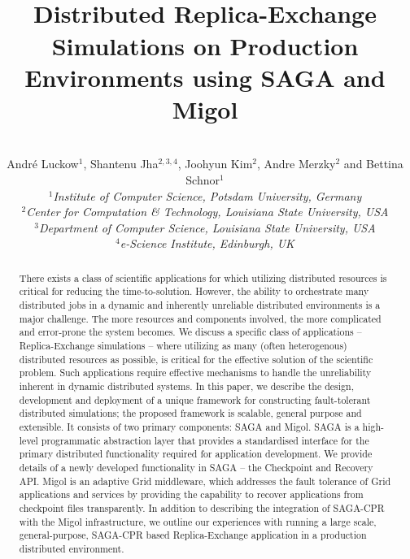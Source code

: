 \documentclass[conference,final]{IEEEtran}
\title{
  ~\\[-3em]
  Distributed Replica-Exchange Simulations on Production Environments
  using SAGA and Migol}
\author{
  ~\\[-2em]
  Andr\'e Luckow$^{1}$, Shantenu Jha$^{2,3,4}$, Joohyun Kim$^{2}$, Andre Merzky$^{2}$ and Bettina Schnor$^{1}$\\
  \small{\emph{$^{1}$Institute of Computer Science, Potsdam University, Germany}}\\
  \small{\emph{$^{2}$Center for Computation \& Technology, Louisiana State University, USA}}\\
  \small{\emph{$^{3}$Department of Computer Science, Louisiana State
      University, USA}}\\
  \small{\emph{$^{4}$e-Science Institute, Edinburgh, UK}}\\
}
\newcommand{\up}{\vspace*{-1em}}
\begin{document}
 


\maketitle    

\up\up\up\up
\begin{abstract}
  There exists a class of scientific applications for which utilizing
  distributed resources is critical for reducing the
  time-to-solution. However, the ability to orchestrate many
  distributed jobs in a dynamic and inherently unreliable distributed
  environments is a major challenge. The more resources and components
  involved, %
  the more complicated and error-prone the system becomes. We discuss
  a specific class of applications -- Replica-Exchange simulations
  -- where utilizing as many (often heterogenous) distributed
  resources as possible, is critical for the effective solution of the
  scientific problem. Such applications require effective mechanisms
  to handle the unreliability inherent in dynamic distributed systems.
  In this paper, we describe the design, development and deployment of
  a unique framework for constructing fault-tolerant distributed
  simulations; %
  the proposed framework is scalable, general purpose and
  extensible. It consists of two primary components: SAGA and Migol.
  SAGA is a high-level programmatic abstraction layer that provides a
  standardised interface for the primary distributed functionality
  required for application development. We provide details of a newly
  developed functionality in SAGA -- the Checkpoint and Recovery
  API. Migol is an adaptive Grid middleware, which addresses the fault
  tolerance of Grid applications and services by providing the
  capability to recover applications from checkpoint files
  transparently.  In addition to describing
  the integration of SAGA-CPR with the Migol infrastructure, 
  we outline our experiences with
  running a large scale, general-purpose, SAGA-CPR based
  Replica-Exchange application in a production distributed
  environment.

    

\end{abstract}
\end{document}
